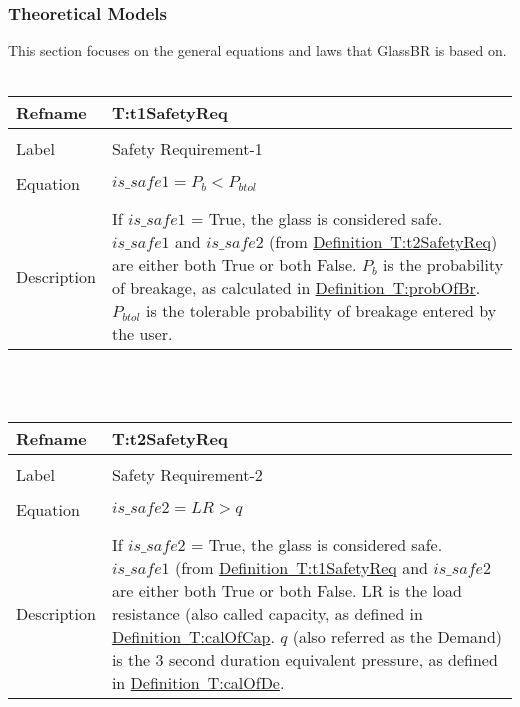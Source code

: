 \documentclass[12pt]{article}
\begin{document}
\subsubsection{Theoretical Models}
\label{Sec:TheoMode}
This section focuses on the general equations and laws that GlassBR is based on.
~\newline
\noindent \begin{minipage}{\textwidth}
\begin{tabular}{p{} p{}}
\toprule \textbf{Refname} & \textbf{T:t1SafetyReq}
\label{T:t1SafetyReq}
\\ \midrule \\
Label & Safety Requirement-1
\\ \midrule \\
Equation & $is\_safe1=P_{b}<P_{btol}$
\\ \midrule \\
Description & If $is\_safe1$ = True, the glass is considered safe. $is\_safe1$ and $is\_safe2$ (from \hyperref[T:t2SafetyReq]{Definition~T:t2SafetyReq}) are either both True or both False. $P_{b}$ is the probability of breakage, as calculated in \hyperref[T:probOfBr]{Definition~T:probOfBr}. $P_{btol}$ is the tolerable probability of breakage entered by the user.
\\ \bottomrule \end{tabular}
\end{minipage}\\
~\newline
\noindent \begin{minipage}{\textwidth}
\begin{tabular}{p{} p{}}
\toprule \textbf{Refname} & \textbf{T:t2SafetyReq}
\label{T:t2SafetyReq}
\\ \midrule \\
Label & Safety Requirement-2
\\ \midrule \\
Equation & $is\_safe2=LR>q$
\\ \midrule \\
Description & If $is\_safe2$ = True, the glass is considered safe. $is\_safe1$ (from \hyperref[T:t1SafetyReq]{Definition~T:t1SafetyReq} and $is\_safe2$ are either both True or both False. LR is the load resistance (also called capacity, as defined in \hyperref[T:calOfCap]{Definition~T:calOfCap}. $q$ (also referred as the Demand) is the 3 second duration equivalent pressure, as defined in \hyperref[T:calOfDe]{Definition~T:calOfDe}.
\\ \bottomrule \end{tabular}
\end{minipage}\\
\end{document}
